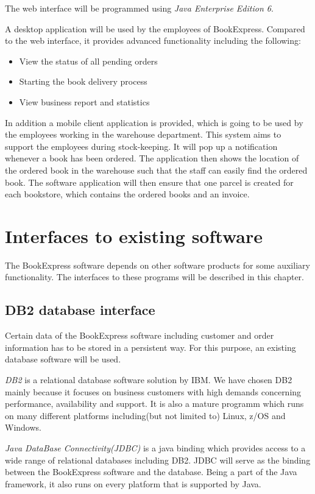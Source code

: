 The web interface will be programmed using \emph{Java Enterprise Edition 6}.

A desktop application will be used by the employees of BookExpress. Compared to the web interface, it provides advanced functionality including the following:
\begin{itemize}
\item View the status of all pending orders
\item Starting the book delivery process
\item View business report and statistics
\end{itemize}

In addition a mobile client application is provided, which is going to be used by the employees working in the warehouse department. This system aims to support the employees during stock-keeping. It will pop up a notification whenever a book has been ordered. The application then shows the location of the ordered book in the warehouse such that the staff can easily find the ordered book. The software application will then ensure that one parcel is created for each bookstore, which contains the ordered books and an invoice.

\section{Interfaces to existing software}
The BookExpress software depends on other software products for some auxiliary functionality. The interfaces to these programs will be described in this chapter.
\subsection{DB2 database interface}
Certain data of the BookExpress software including customer and order information has to be stored in a persistent way. For this purpose, an existing database software will be used.

\emph{DB2} is a relational database software solution by IBM. We have chosen DB2 mainly because it focuses on business customers with high demands concerning performance, availability and support. It is also a mature programm which runs on many different platforms including(but not limited to) Linux, z/OS and Windows.

\emph{Java DataBase Connectivity(JDBC)} is a java binding which provides access to a wide range of relational databases including DB2. JDBC will serve as the binding between the BookExpress software and the database. Being a part of the Java framework, it also runs on every platform that is supported by Java.

